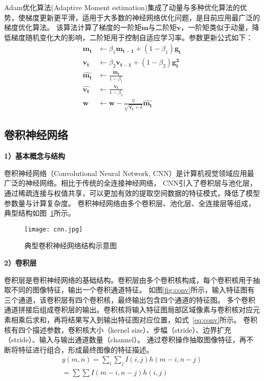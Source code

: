 Adam优化算法(Adaptive Moment estimation)集成了动量与多种优化算法的优势，使梯度更新更平滑，适用于大多数的神经网络优化问题，是目前应用最广泛的梯度优化算法。
该算法计算了梯度的一阶矩$\boldsymbol{m}$与二阶矩$\boldsymbol{v}$，一阶矩类似于动量，降低梯度随机变化大的影响，二阶矩用于控制自适应学习率。参数更新公式如下：
\begin{equation}
  \begin{aligned}
    \boldsymbol{m_t}  & \leftarrow  \beta_1 \boldsymbol{m_{t-1}}  + (1 - \beta_1) \boldsymbol{g_t} \\
    \boldsymbol{v_t}  & \leftarrow  \beta_2 \boldsymbol{v_{t-1}}  + (1 - \beta_2) \boldsymbol{g_t^2} \\
    \boldsymbol{\hat{m_t}} &  \leftarrow \frac{\boldsymbol{m_t}}{1 - \beta_1} \\
    \boldsymbol{\hat{v_t}} &  \leftarrow \frac{\boldsymbol{v_t}}{1 - \beta_2} \\
    \boldsymbol{w}  & \leftarrow  \boldsymbol{w} - \frac{\eta}{\sqrt{\boldsymbol{\hat{v_t}} + \delta}} \boldsymbol{\hat{m_t}}
  \end{aligned}
  \label{eq:Adam}
\end{equation}




\subsection{卷积神经网络}

\textbf{1）基本概念与结构}

卷积神经网络（Convolutional Neural Network, CNN）是计算机视觉领域应用最广泛的神经网络。相比于传统的全连接神经网络，
CNN引入了卷积层与池化层，通过稀疏连接与权值共享，可以更加有效的提取空间数据的特征模式，降低了模型参数量与计算复杂度。
卷积神经网络由多个卷积层、池化层、全连接层等组成，典型结构如图~\ref{fig:cnn}所示。

\begin{figure}
  \centering
  \texttt{[image: cnn.jpg]}
  \caption{典型卷积神经网络结构示意图}
  \label{fig:cnn}
\end{figure}

\textbf{2）卷积层}

卷积层是卷积神经网络的基础结构。卷积层由多个卷积核构成，每个卷积核用于抽取不同的图像特征，输出一个卷积通道特征。
如图\ref{fig:conv}所示，输入特征图有三个通道，该卷积层有四个卷积核，最终输出包含四个通道的特征图。
多个卷积通道拼接后组成卷积层的输出。卷积核将输入特征图局部区域像素与卷积核对应元素相乘后求和，再将结果写入到输出特征图对应位置，如式~\ref{eq:conv}所示。
卷积核有四个描述参数，卷积核大小（kernel size）、步幅（stride）、边界扩充（stride）、输入与输出通道数量（channel）。
通过卷积操作抽取图像特征，再不断将特征进行组合，形成最终图像的特征描述。
\begin{equation}
  \begin{array}{l}
    y(m, n)=\sum_{i} \sum_{j} I(i, j) h(m-i, n-j) \\
    =\sum \sum I(m-i, n-j) h(i, j)
    \end{array}
  \label{eq:conv}
\end{equation}

